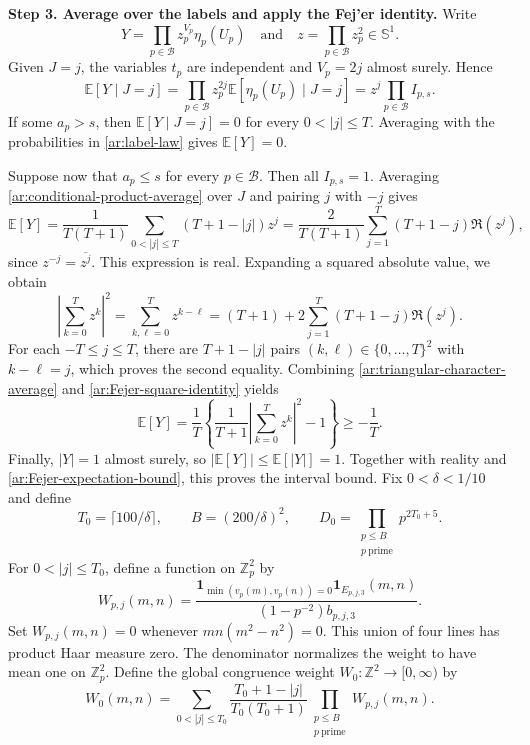 \documentclass[twoside]{aomart}
\makeatletter
\theoremstyle{paperplain}
\theoremstyle{paperdefinition}
\renewenvironment{proof}[1][\proofname]{\par\pushQED{\qed}%
  \normalfont\topsep6\p@\@plus3\p@\relax\trivlist
  \item[\hskip\labelsep\itshape #1\@addpunct{.}]\ignorespaces
}{\popQED\endtrivlist\@endpefalse}
\newcommand{\E}{\mathbb E}
\newcommand{\Z}{\mathbb Z}
\numberwithin{equation}{section}
\makeatother
\begin{document}
\begin{proof}
\medskip
\noindent\textbf{Step 3. Average over the labels and apply the Fej'er identity.}
Write $$Y=\prod_{p\in\mathcal B}z_p^{V_p}\eta_p(U_p)\quad \text{and} \quad
z=\prod_{p\in\mathcal B}z_p^2\in\mathbb S^1.$$
Given $J=j$, the variables $t_p$ are independent and
$V_p=2j$ almost surely. Hence
\begin{equation}
 \E[Y\mid J=j]=\prod_{p\in\mathcal B}z_p^{2j}\E[\eta_p(U_p)\mid J=j]=z^j\prod_{p\in\mathcal B}I_{p,s}.
 \label{ar:conditional-product-average}
\end{equation}
If some $a_p>s$, then $\E[Y\mid J=j]=0$ for every
$0<|j|\le T$. Averaging with the probabilities in
\eqref{ar:label-law} gives $\E[Y]=0$.

Suppose now that $a_p\le s$ for every $p\in\mathcal B$.
Then all $I_{p,s}=1$. Averaging \eqref{ar:conditional-product-average}
over $J$ and pairing $j$ with $-j$ gives
\begin{equation}
 \E[Y]=\frac1{T(T+1)}\sum_{0<|j|\le T}(T+1-|j|)z^j
 =\frac2{T(T+1)}\sum_{j=1}^T(T+1-j)\Re(z^j),
 \label{ar:triangular-character-average}
\end{equation}
since $z^{-j}=\overline{z^j}$. This expression is real.
Expanding a squared absolute value, we obtain
\begin{equation}
 \left|\sum_{k=0}^Tz^k\right|^2=\sum_{k,\ell=0}^Tz^{k-\ell}
 =(T+1)+2\sum_{j=1}^T(T+1-j)\Re(z^j).
 \label{ar:Fejer-square-identity}
\end{equation}
For each $-T\le j\le T$, there are $T+1-|j|$ pairs
$(k,\ell)\in\{0,\ldots,T\}^2$ with $k-\ell=j$, which proves
the second equality. Combining
\eqref{ar:triangular-character-average} and
\eqref{ar:Fejer-square-identity} yields
\begin{equation}
 \E[Y]=\frac1T\left\{
       \frac1{T+1}\left|\sum_{k=0}^Tz^k\right|^2-1\right\}
 \ge-\frac1T.
 \label{ar:Fejer-expectation-bound}
\end{equation}
Finally, $|Y|=1$ almost surely, so
$|\E[Y]|\le\E[|Y|]=1$. Together with reality and
\eqref{ar:Fejer-expectation-bound}, this proves the interval bound.
\end{proof}
Fix $0<\delta<1/10$ and define
\begin{equation}
 T_0=\lceil100/\delta\rceil,\qquad
 B=(200/\delta)^2,\qquad
 D_0=\prod_{\substack{p\le B\\p\ \mathrm{prime}}}p^{2T_0+5}.
 \label{ar:parameters}
\end{equation}
For $0<|j|\le T_0$, define a function on $\Z_p^2$ by
\begin{equation}
 W_{p,j}(m,n)=\frac{\mathbf1_{\min(v_p(m),v_p(n))=0}\mathbf1_{E_{p,j,3}}(m,n)}{(1-p^{-2})b_{p,j,3}}.
 \label{ar:local-weight}
\end{equation}
Set $W_{p,j}(m,n)=0$ whenever $mn(m^2-n^2)=0$.
This union of four lines has product Haar measure zero.
The denominator normalizes the weight to have mean one on $\Z_p^2$.
Define the global congruence weight $W_0:\Z^2\to[0,\infty)$ by
\begin{equation}
 W_0(m,n)=\sum_{0<|j|\le T_0}
 \frac{T_0+1-|j|}{T_0(T_0+1)}\prod_{\substack{p\le B\\p\ \mathrm{prime}}}W_{p,j}(m,n).
 \label{ar:congruence-weight}
\end{equation}
\end{document}
